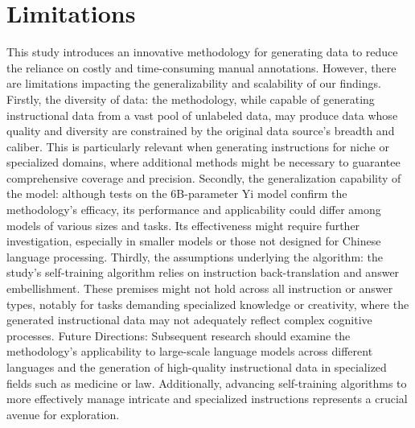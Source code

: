 \section{Limitations}
This study introduces an innovative methodology for generating data to reduce the reliance on costly and time-consuming manual annotations. However, there are limitations impacting the generalizability and scalability of our findings. 
Firstly, the diversity of data: the methodology, while capable of generating instructional data from a vast pool of unlabeled data, may produce data whose quality and diversity are constrained by the original data source's breadth and caliber. This is particularly relevant when generating instructions for niche or specialized domains, where additional methods might be necessary to guarantee comprehensive coverage and precision. Secondly, the generalization capability of the model: although tests on the 6B-parameter Yi model confirm the methodology's efficacy, its performance and applicability could differ among models of various sizes and tasks. Its effectiveness might require further investigation, especially in smaller models or those not designed for Chinese language processing. Thirdly, the assumptions underlying the algorithm: the study's self-training algorithm relies on instruction back-translation and answer embellishment. These premises might not hold across all instruction or answer types, notably for tasks demanding specialized knowledge or creativity, where the generated instructional data may not adequately reflect complex cognitive processes. Future Directions: Subsequent research should examine the methodology's applicability to large-scale language models across different languages and the generation of high-quality instructional data in specialized fields such as medicine or law. Additionally, advancing self-training algorithms to more effectively manage intricate and specialized instructions represents a crucial avenue for exploration.

\clearpage

